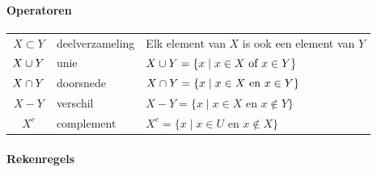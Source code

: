 \paragraph{Operatoren}
\begin{center}
  \begin{longtable}{clp{7cm}}
    $X \subset Y$ & deelverzameling & Elk element van $X$ is ook een element van $Y$ \\[2mm]
    $X \cup Y$ & unie & $X \cup Y = \{ x \;|\; x \in X \text{ of } x \in Y \}$ \\[2mm]
    $X \cap Y$ & doorsnede & $X \cap Y = \{ x \;|\; x \in X \text{ en } x \in Y \}$ \\[2mm]
    $X - Y$ & verschil & $X - Y = \{ x \;|\; x \in X \text{ en } x \notin Y \}$ \\[2mm]
    $X^c$ & complement & $X^c = \{ x \;|\; x \in U \text{ en } x \notin X \}$ \\
  \end{longtable}
\end{center}
 
\paragraph{Rekenregels}

 

